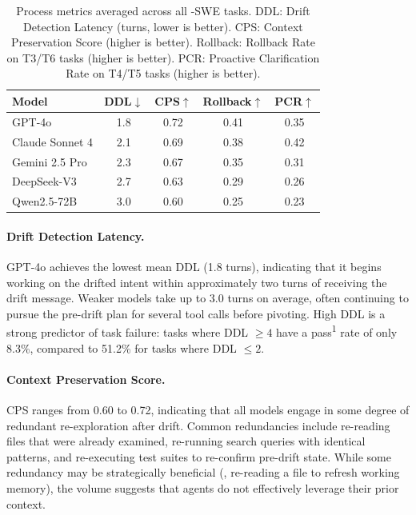 \begin{table}[t]
\centering
\caption{Process metrics averaged across all \bench{}-SWE tasks. DDL: Drift Detection Latency (turns, lower is better). CPS: Context Preservation Score (higher is better). Rollback: Rollback Rate on T3/T6 tasks (higher is better). PCR: Proactive Clarification Rate on T4/T5 tasks (higher is better).}
\label{tab:process-metrics}
\small
\begin{tabular}{l cccc}
\toprule
\textbf{Model} & \textbf{DDL}$\downarrow$ & \textbf{CPS}$\uparrow$ & \textbf{Rollback}$\uparrow$ & \textbf{PCR}$\uparrow$ \\
\midrule
GPT-4o          & 1.8 & 0.72 & 0.41 & 0.35 \\
Claude Sonnet 4 & 2.1 & 0.69 & 0.38 & 0.42 \\
Gemini 2.5 Pro  & 2.3 & 0.67 & 0.35 & 0.31 \\
DeepSeek-V3     & 2.7 & 0.63 & 0.29 & 0.26 \\
Qwen2.5-72B     & 3.0 & 0.60 & 0.25 & 0.23 \\
\bottomrule
\end{tabular}
\end{table}

\paragraph{Drift Detection Latency.}
GPT-4o achieves the lowest mean DDL (1.8 turns), indicating that it begins working on the drifted intent within approximately two turns of receiving the drift message. Weaker models take up to 3.0 turns on average, often continuing to pursue the pre-drift plan for several tool calls before pivoting. High DDL is a strong predictor of task failure: tasks where DDL $\geq 4$ have a pass\textsuperscript{1} rate of only 8.3\%, compared to 51.2\% for tasks where DDL $\leq 2$.

\paragraph{Context Preservation Score.}
CPS ranges from 0.60 to 0.72, indicating that all models engage in some degree of redundant re-exploration after drift. Common redundancies include re-reading files that were already examined, re-running search queries with identical patterns, and re-executing test suites to re-confirm pre-drift state. While some redundancy may be strategically beneficial (\eg, re-reading a file to refresh working memory), the volume suggests that agents do not effectively leverage their prior context.

